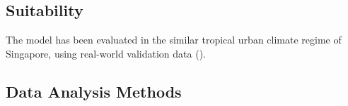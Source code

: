 \subsection{Suitability}


The model has been evaluated in the similar tropical urban climate regime of Singapore, using real-world validation data (\cite{demuzere_singapore}). 

\cite{chua_evaluation} 

\subsection{Data Analysis Methods}





    




